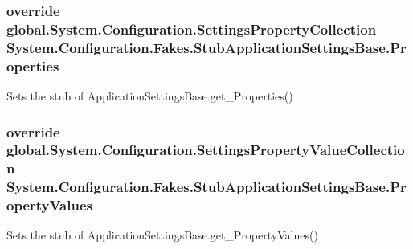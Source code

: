 \hypertarget{class_system_1_1_configuration_1_1_fakes_1_1_stub_application_settings_base_a77357c08cb4c7f6deebf3b84ab8aca1d}{
\subsubsection[{Properties}]{\setlength{\rightskip}{0pt plus 5cm}override global.\-System.\-Configuration.\-Settings\-Property\-Collection System.\-Configuration.\-Fakes.\-Stub\-Application\-Settings\-Base.\-Properties\hspace{0.3cm}{\ttfamily [get]}}}\label{class_system_1_1_configuration_1_1_fakes_1_1_stub_application_settings_base_a77357c08cb4c7f6deebf3b84ab8aca1d}


Sets the stub of Application\-Settings\-Base.\-get\-\_\-\-Properties()

\hypertarget{class_system_1_1_configuration_1_1_fakes_1_1_stub_application_settings_base_a2bd5805f9aa5bf613931e6090a1de854}{
\subsubsection[{Property\-Values}]{\setlength{\rightskip}{0pt plus 5cm}override global.\-System.\-Configuration.\-Settings\-Property\-Value\-Collection System.\-Configuration.\-Fakes.\-Stub\-Application\-Settings\-Base.\-Property\-Values\hspace{0.3cm}{\ttfamily [get]}}}\label{class_system_1_1_configuration_1_1_fakes_1_1_stub_application_settings_base_a2bd5805f9aa5bf613931e6090a1de854}


Sets the stub of Application\-Settings\-Base.\-get\-\_\-\-Property\-Values()

